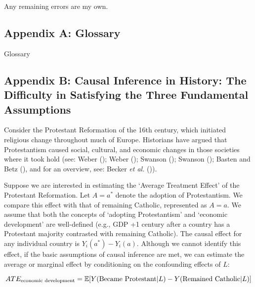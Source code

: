 \documentclass[
  single column]{article}
\begin{document}
Any remaining errors are my own.

\newpage{}

\subsection{Appendix A: Glossary}\label{id-app-a}

\begin{table}

\caption{\label{tbl-experiments}Glossary}

\centering{

\glossaryTerms

}

\end{table}%

\newpage{}

\subsection{Appendix B: Causal Inference in History: The Difficulty in
Satisfying the Three Fundamental Assumptions}\label{id-app-b}

Consider the Protestant Reformation of the 16th century, which initiated
religious change throughout much of Europe. Historians have argued that
Protestantism caused social, cultural, and economic changes in those
societies where it took hold (see: Weber
(); Weber
(); Swanson
(); Swanson
(); Basten and Betz
(), and for an overview, see: Becker
\emph{et al.} ()).

Suppose we are interested in estimating the `Average Treatment Effect'
of the Protestant Reformation. Let \(A = a^*\) denote the adoption of
Protestantism. We compare this effect with that of remaining Catholic,
represented as \(A = a\). We assume that both the concepts of `adopting
Protestantism' and `economic development' are well-defined (e.g., GDP +1
century after a country has a Protestant majority contrasted with
remaining Catholic). The causal effect for any individual country is
\(Y_i(a^*) - Y_i(a)\). Although we cannot identify this effect, if the
basic assumptions of causal inference are met, we can estimate the
average or marginal effect by conditioning on the confounding effects of
\(L\):

\[
ATE_{\textnormal{economic~development}} = \mathbb{E}[Y(\textnormal{Became~Protestant}|L) - Y(\textnormal{Remained~Catholic}|L)]
\]
\end{document}
